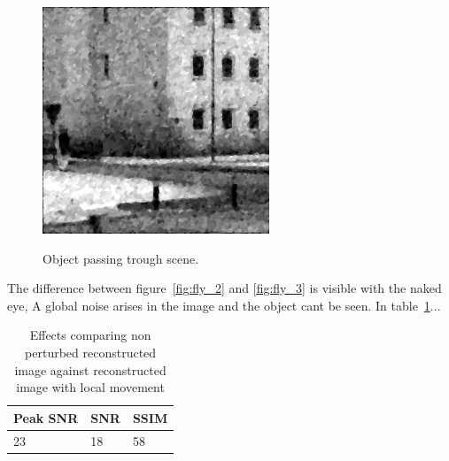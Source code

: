 \begin{figure}[H]
\begin{minipage}[t]{0.32\textwidth}
    \label{fig:fly_2}
\end{minipage}
\begin{minipage}[t]{0.32\textwidth}
    \includegraphics[width = \textwidth]{result/dynamic/fly/flyby_1sec_res_psnr_23_snr_18_sssim_58.png}
    \label{fig:fly_3}
\end{minipage}
    \caption{Object passing trough scene.}
    \label{fig:fly_dyn}
\end{figure}

The difference between figure~\ref{fig:fly_2} and \ref{fig:fly_3} is visible with the naked eye, A global noise arises in the image and the object cant be seen. In table~\ref{tab:fly_dyn}...


\begin{table}[H]
    \centering
  \begin{tabular}{ | l | l | l |}
    \hline
    Peak SNR & SNR & SSIM \\ \hline
    23 & 18 & 58 \\ 
    \hline
  \end{tabular}
      \caption{Effects comparing non perturbed reconstructed image against reconstructed image with local movement}
    \label{tab:fly_dyn}
\end{table}


